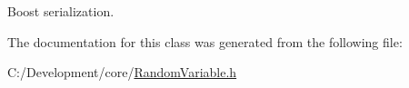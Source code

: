 Boost serialization. 



The documentation for this class was generated from the following file\-:\begin{DoxyCompactItemize}
\item 
C\-:/\-Development/core/\hyperlink{_random_variable_8h}{Random\-Variable.\-h}\end{DoxyCompactItemize}

